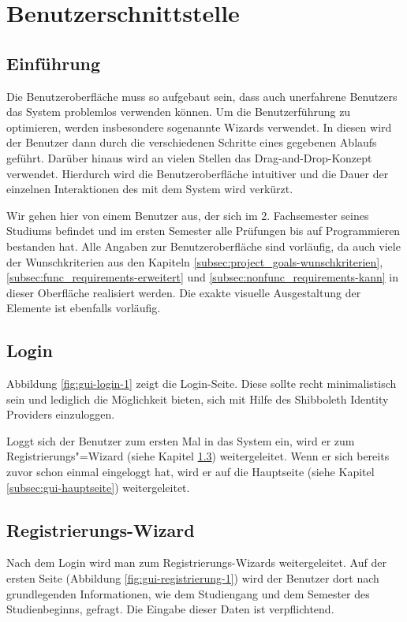 \section{Benutzerschnittstelle}

\subsection{Einführung}
Die Benutzeroberfläche muss so aufgebaut sein, dass auch unerfahrene \glspl{Benutzer} das System problemlos verwenden können.
Um die Benutzerführung zu optimieren, werden insbesondere sogenannte \glspl{Wizard} verwendet. In diesen wird der Benutzer dann durch die verschiedenen Schritte eines gegebenen Ablaufs geführt. Darüber hinaus wird an vielen Stellen das \gls{Drag-and-Drop}-Konzept verwendet.
Hierdurch wird die Benutzeroberfläche intuitiver und die Dauer der einzelnen Interaktionen des  mit dem System wird verkürzt.

Wir gehen hier von einem \gls{Benutzer} aus, der sich im 2. Fachsemester seines Studiums befindet und im ersten Semester alle Prüfungen bis auf Programmieren bestanden hat.
Alle Angaben zur Benutzeroberfläche sind vorläufig, da auch viele der Wunschkriterien aus den Kapiteln \ref{subsec:project_goals-wunschkriterien}, \ref{subsec:func_requirements-erweitert} und \ref{subsec:nonfunc_requirements-kann} in dieser Oberfläche realisiert werden. Die exakte visuelle Ausgestaltung der Elemente ist ebenfalls vorläufig.
\subsection{Login}
Abbildung \ref{fig:gui-login-1} zeigt die Login-Seite. Diese sollte recht minimalistisch sein und lediglich die Möglichkeit bieten, sich mit Hilfe des \gls{Shibboleth Identity Provider}s einzuloggen.

Loggt sich der \gls{Benutzer} zum ersten Mal in das System ein, wird er zum Registrierungs"=\gls{Wizard} (siehe Kapitel \ref{subsec:gui-registrierung}) weitergeleitet. Wenn er sich bereits zuvor schon einmal eingeloggt hat, wird er auf die Hauptseite (siehe Kapitel \ref{subsec:gui-hauptseite}) weitergeleitet.
\subsection{Registrierungs-Wizard}
\label{subsec:gui-registrierung}
Nach dem Login wird man zum Registrierungs-\gls{Wizard}s weitergeleitet. Auf der ersten Seite (Abbildung \ref{fig:gui-registrierung-1}) wird der \gls{Benutzer} dort nach grundlegenden Informationen, wie dem \gls{Studiengang} und dem \gls{Semester des Studienbeginns}, gefragt. Die Eingabe dieser Daten ist verpflichtend.

